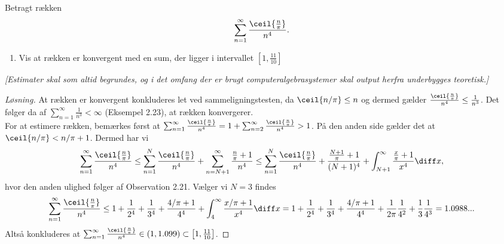 \begin{opg}
		Betragt rækken $$ \sum_{n=1}^{\infty}\frac{\ceil{\frac{n}{\pi}}}{n^4}. $$
		\begin{enumerate}
			\item Vis at rækken er konvergent med en sum, der ligger i intervallet $\left[1,\frac{11}{10}\right] $	
		\end{enumerate}
		\textsl{[Estimater skal som altid begrundes, og i det omfang der er brugt computeralgebrasystemer skal output herfra underbygges teoretisk.]}

		\ifanswers
		\begin{proof}[Løsning]
			At rækken er konvergent konkluderes let ved sammeligningstesten, da $ \ceil{n/\pi}\leq n $ og dermed gælder $ \frac{\ceil{\frac{n}{\pi}}}{n^4}\leq \frac{1}{n^3} $. Det følger da af $ \sum_{n=1}^{\infty}\frac{1}{n^3}<\infty $ (Eksempel 2.23), at rækken konvergerer.\\
			For at estimere rækken, bemærkes først at $ \sum_{n=1}^{\infty}\frac{\ceil{\frac{n}{\pi}}}{n^4}=1+\sum_{n=2}^{\infty}\frac{\ceil{\frac{n}{\pi}}}{n^4}>1 $. På den anden side gælder det at $ \ceil{n/\pi}<n/\pi+1 $. Dermed har vi \begin{equation*}
			\sum_{n=1}^{\infty}\frac{\ceil{\frac{n}{\pi}}}{n^4}\leq \sum_{n=1}^{N}\frac{\ceil{\frac{n}{\pi}}}{n^4}+\sum_{n=N+1}^{\infty}\frac{\frac{n}{\pi}+1}{n^4}\leq \sum_{n=1}^{N}\frac{\ceil{\frac{n}{\pi}}}{n^4}+\frac{\frac{N+1}{\pi}+1}{(N+1)^4}+\int_{N+1}^{\infty}\frac{\frac{x}{\pi}+1}{x^4}\diff x,
			\end{equation*}
			hvor den anden ulighed følger af Observation 2.21.
			Vælger vi $ N=3 $ findes\begin{equation*}
			\sum_{n=1}^{\infty}\frac{\ceil{\frac{n}{\pi}}}{n^4}\leq 1+\frac{1}{2^4}+\frac{1}{3^4}+\frac{4/\pi+1}{4^4}+\int_{4}^{\infty}\frac{x/\pi+1}{x^4}\diff x=1+\frac{1}{2^4}+\frac{1}{3^4}+\frac{4/\pi+1}{4^4}+\frac{1}{2\pi}\frac{1}{4^2}+\frac{1}{3}\frac{1}{4^3}=1.0988...
			\end{equation*}
			Altså konkluderes at $\sum_{n=1}^{\infty}\frac{\ceil{\frac{n}{\pi}}}{n^4}\in(1,1.099)\subset\left[1,\frac{11}{10}\right]  $.
		\end{proof}
		\fi
\end{opg}

